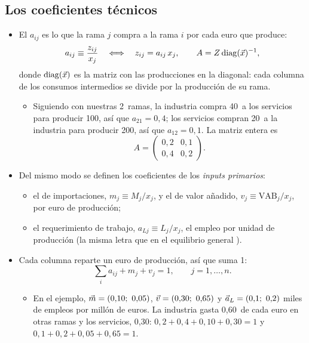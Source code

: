 \documentclass[11pt]{article}
\begin{document}
\subsection{Los coeficientes técnicos}\label{sec:coeficientes}

\begin{itemize}
\item El  $a_{ij}$ es lo que la rama $j$ compra a la rama $i$ por cada euro que produce:
\begin{equation}\label{eq:coeficiente}
a_{ij}\equiv\frac{z_{ij}}{x_j}\quad\Longleftrightarrow\quad z_{ij}=a_{ij}\,x_j,\qquad A=Z\operatorname{diag}(\vec{x})^{-1},
\end{equation}
  donde $\operatorname{diag}(\vec{x})$ es la matriz con las producciones en la diagonal: cada columna de los consumos intermedios se divide por la producción de su rama.
  \begin{itemize}
  \item Siguiendo con nuestras 2~ramas, la industria compra 40~a los servicios para producir 100, así que $a_{21}=0{,}4$; los servicios compran 20~a la industria para producir 200, así que $a_{12}=0{,}1$. La matriz entera es
\[
A=\begin{pmatrix}0{,}2 & 0{,}1\\ 0{,}4 & 0{,}2\end{pmatrix}.
\]
  \end{itemize}
\item Del mismo modo se definen los coeficientes de los \emph{inputs primarios}:
  \begin{itemize}
  \item el de importaciones, $m_j\equiv M_j/x_j$, y el de valor añadido, $v_j\equiv\mathrm{VAB}_j/x_j$, por euro de producción;
  \item el requerimiento de trabajo, $a_{Lj}\equiv L_j/x_j$, el empleo por unidad de producción (la misma letra que en el equilibrio general ).
  \end{itemize}
\item Cada columna reparte un euro de producción, así que suma 1:
\begin{equation}\label{eq:suma-columna}
\sum_{i}a_{ij}+m_j+v_j=1,\qquad j=1,\dots,n.
\end{equation}
  \begin{itemize}
  \item En el ejemplo, $\vect{m}=(0{,}10;\ 0{,}05)$, $\vect{v}=(0{,}30;\ 0{,}65)$ y $\vect{a}_L=(0{,}1;\ 0{,}2)$ miles de empleos por millón de euros. La industria gasta 0,60~de cada euro en otras ramas y los servicios, 0,30: $0{,}2+0{,}4+0{,}10+0{,}30=1$ y $0{,}1+0{,}2+0{,}05+0{,}65=1$.

\end{itemize}
\end{itemize}
\end{document}
